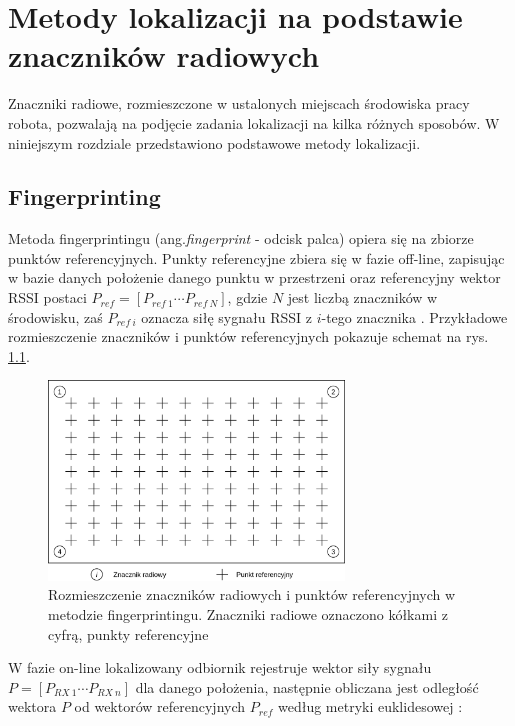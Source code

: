 \chapter{Metody lokalizacji na podstawie znaczników radiowych}
\label{ch:metody-lokalizacji}

Znaczniki radiowe, rozmieszczone w ustalonych miejscach środowiska pracy robota, pozwalają na podjęcie zadania lokalizacji na kilka różnych sposobów. W niniejszym rozdziale przedstawiono podstawowe metody lokalizacji.

\section{Fingerprinting}
Metoda fingerprintingu (ang.\textit{fingerprint} - odcisk palca) opiera się na zbiorze punktów referencyjnych. Punkty referencyjne zbiera się w fazie off-line, zapisując w bazie danych położenie danego punktu w przestrzeni oraz referencyjny wektor RSSI postaci $P_{ref} = [ P_{ref \ 1} \cdots P_{ref  \ N}]$, gdzie $N$ jest liczbą znaczników w środowisku, zaś $P_{ref \ i}$ oznacza siłę sygnału RSSI z $i$-tego znacznika \cite{fingerprinting}. Przykładowe rozmieszczenie znaczników i punktów referencyjnych pokazuje schemat na rys. \ref{fig:fingerprinting}.


\begin{figure}[H]
\centering
\includegraphics[width=0.7\textwidth]{img/fingerprinting.png}
\caption{Rozmieszczenie znaczników radiowych i punktów referencyjnych w metodzie fingerprintingu. Znaczniki radiowe oznaczono kółkami z cyfrą, punkty referencyjne }
\label{fig:fingerprinting}
\end{figure}

W fazie on-line lokalizowany odbiornik rejestruje wektor siły sygnału $P = [ P_{RX \ 1} \cdots P_{RX \ n}]$ dla danego położenia, następnie obliczana jest odległość wektora $P$ od wektorów referencyjnych $P_{ref}$ według metryki euklidesowej \cite{fingerprinting2}:


